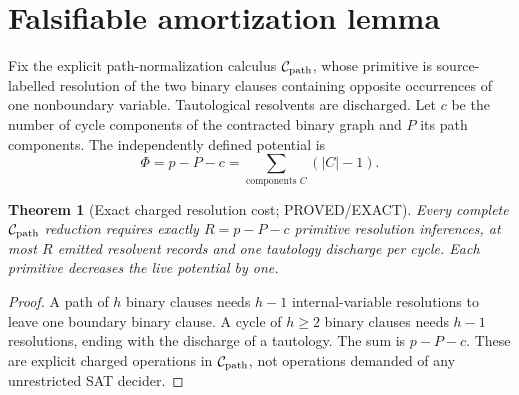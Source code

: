 \documentclass[11pt]{article}
\newtheorem{theorem}{Theorem}
\begin{document}
\section{Falsifiable amortization lemma}
Fix the explicit path-normalization calculus $\mathcal C_{\rm path}$, whose primitive is source-labelled resolution of the two binary clauses containing opposite occurrences of one nonboundary variable. Tautological resolvents are discharged. Let $c$ be the number of cycle components of the contracted binary graph and $P$ its path components. The independently defined potential is
\[
\Phi=p-P-c=\sum_{\text{components }C}(|C|-1).
\]
\begin{theorem}[Exact charged resolution cost; PROVED/EXACT]
Every complete $\mathcal C_{\rm path}$ reduction requires exactly $R=p-P-c$ primitive resolution inferences, at most $R$ emitted resolvent records and one tautology discharge per cycle. Each primitive decreases the live potential by one.
\end{theorem}
\begin{proof}
A path of $h$ binary clauses needs $h-1$ internal-variable resolutions to leave one boundary binary clause. A cycle of $h\ge2$ binary clauses needs $h-1$ resolutions, ending with the discharge of a tautology. The sum is $p-P-c$. These are explicit charged operations in $\mathcal C_{\rm path}$, not operations demanded of any unrestricted SAT decider.
\end{proof}
\end{document}
